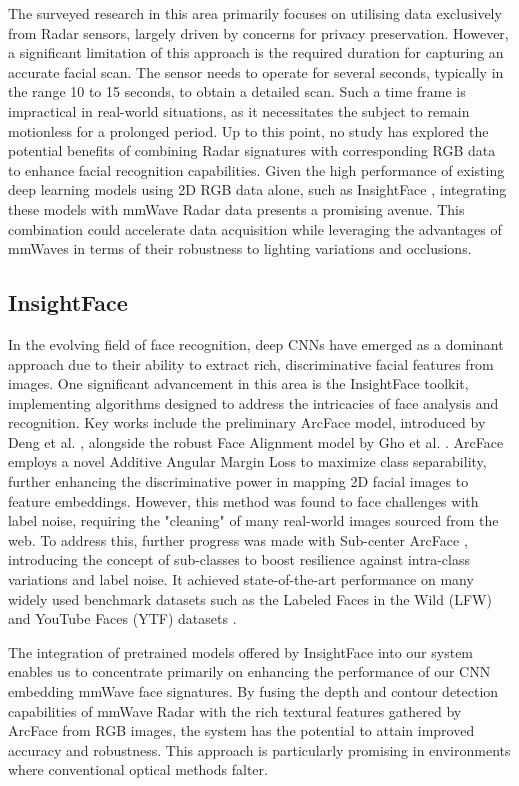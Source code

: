 \documentclass{interim}
\begin{document}
The surveyed research in this area primarily focuses on utilising data exclusively from Radar sensors, largely driven by concerns for privacy preservation. However, a significant limitation of this approach is the required duration for capturing an accurate facial scan. The sensor needs to operate for several seconds, typically in the range 10 to 15 seconds, to obtain a detailed scan. Such a time frame is impractical in real-world situations, as it necessitates the subject to remain motionless for a prolonged period. Up to this point, no study has explored the potential benefits of combining Radar signatures with corresponding RGB data to enhance facial recognition capabilities. Given the high performance of existing deep learning models using 2D RGB data alone, such as InsightFace \cite{deng2018arcface}, integrating these models with mmWave Radar data presents a promising avenue. This combination could accelerate data acquisition while leveraging the advantages of mmWaves in terms of their robustness to lighting variations and occlusions.


\subsection{InsightFace}
In the evolving field of face recognition, deep CNNs have emerged as a dominant approach due to their ability to extract rich, discriminative facial features from images. One significant advancement in this area is the InsightFace toolkit, implementing algorithms designed to address the intricacies of face analysis and recognition. Key works include the preliminary ArcFace model, introduced by Deng et al. \cite{deng2018arcface}, alongside the robust Face Alignment model by Gho et al. \cite{guo2018stacked}. ArcFace employs a novel Additive Angular Margin Loss to maximize class separability, further enhancing the discriminative power in mapping 2D facial images to feature embeddings. However, this method was found to face challenges with label noise, requiring the "cleaning" of many real-world images sourced from the web. To address this, further progress was made with Sub-center ArcFace \cite{deng2020subcenter}, introducing the concept of sub-classes to boost resilience against intra-class variations and label noise. It achieved state-of-the-art performance on many widely used benchmark datasets such as the Labeled Faces in the Wild (LFW) \cite{huang2008labeled} and YouTube Faces (YTF) datasets \cite{wolf2011face}.

The integration of pretrained models offered by InsightFace into our system enables us to concentrate primarily on enhancing the performance of our CNN embedding mmWave face signatures. By fusing the depth and contour detection capabilities of mmWave Radar with the rich textural features gathered by ArcFace from RGB images, the system has the potential to attain improved accuracy and robustness. This approach is particularly promising in environments where conventional optical methods falter.
\end{document}
